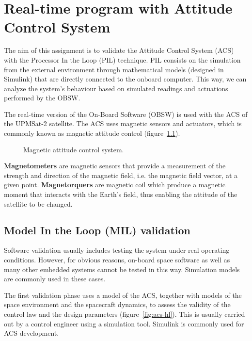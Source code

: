 \chapter{Real-time program with Attitude Control System}\label{ch:assignment7}

The aim of this assignment is to validate the Attitude Control System (ACS)
with the Processor In the Loop (PIL) technique.
PIL consists on the simulation from the external environment
through mathematical models (designed in Simulink)
that are directly connected to the onboard computer.
This way, we can analyze the system's behaviour
based on simulated readings and actuations performed by the OBSW.

The real-time version of the On-Board Software (OBSW) is used with the ACS of the UPMSat-2 satellite. The ACS uses magnetic sensors and actuators, which is commonly known as magnetic attitude control (figure~\ref{fig:acs}).

\begin{figure}[h]
            \caption{Magnetic attitude control system.}
            \label{fig:acs}
\end{figure}

\textbf{Magnetometers} are magnetic sensors that provide a measurement of the strength and direction of the magnetic field, i.e. the magnetic field vector, at a given point. \textbf{Magnetorquers} are magnetic coil which produce a magnetic moment that interacts with the Earth's field, thus enabling the attitude of the satellite to be changed.

\section{Model In the Loop (MIL) validation}

Software validation usually includes testing the system under real operating conditions. However, for obvious reasons, on-board space software as well as many other embedded systems cannot be tested in this way. Simulation models are commonly used in these cases.

The first validation phase uses a model of the ACS, together with models of the space environment and the spacecraft dynamics, to assess the validity of the control law and the design parameters (figure~\ref{fig:acs-hl}). This is usually carried out by a control engineer using a simulation tool. Simulink is commonly used for ACS development.

